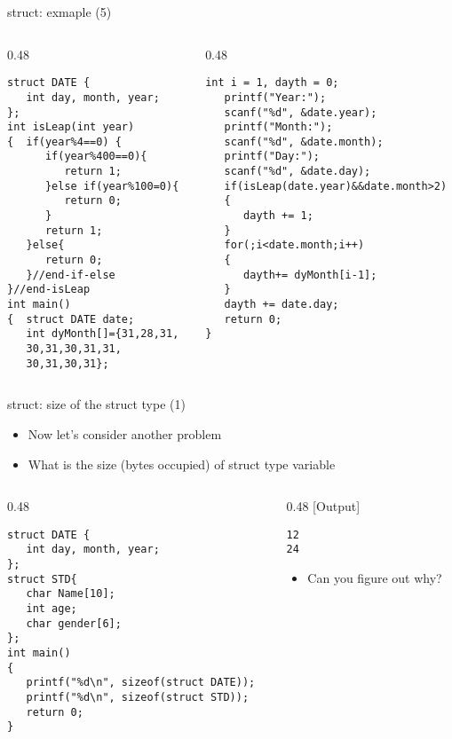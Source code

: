 \begin{frame}[fragile]{struct: exmaple (5)}
\vspace{-0.15in}
\begin{columns}
\begin{column}{0.48\linewidth}
\begin{lstlisting}
struct DATE {
   int day, month, year;
};
int isLeap(int year)
{  if(year%4==0) {
      if(year%400==0){
         return 1;
      }else if(year%100=0){
         return 0;
      }
      return 1;
   }else{
      return 0;
   }//end-if-else
}//end-isLeap
int main()
{  struct DATE date;
   int dyMonth[]={31,28,31,
   30,31,30,31,31,
   30,31,30,31};
\end{lstlisting}
\end{column}
\begin{column}{0.48\linewidth}
\begin{lstlisting}[firstnumber=21]
   int i = 1, dayth = 0;
   printf("Year:");
   scanf("%d", &date.year);
   printf("Month:");
   scanf("%d", &date.month);
   printf("Day:");
   scanf("%d", &date.day);
   if(isLeap(date.year)&&date.month>2)
   {
      dayth += 1;
   }
   for(;i<date.month;i++)
   {
      dayth+= dyMonth[i-1];
   }
   dayth += date.day;
   return 0;
}
\end{lstlisting}
\end{column}
\end{columns}
\end{frame}


\begin{frame}[fragile]{struct: size of the struct type (1)}
\begin{itemize}
	\item {Now let's consider another problem}
	\item {What is the size (bytes occupied) of struct type variable}
\end{itemize}
\begin{columns}
\begin{column}{0.48\linewidth}
\begin{lstlisting}
struct DATE {
   int day, month, year;
};
struct STD{
   char Name[10];
   int age;
   char gender[6];
};
int main()
{  
   printf("%d\n", sizeof(struct DATE));
   printf("%d\n", sizeof(struct STD));
   return 0;
}
\end{lstlisting}
\end{column}
\begin{column}{0.48\linewidth}
[Output]
\begin{lstlisting}
12
24
\end{lstlisting}
\begin{itemize}
	\item {Can you figure out why?}
\end{itemize}
\end{column}
\end{columns}
\end{frame}

